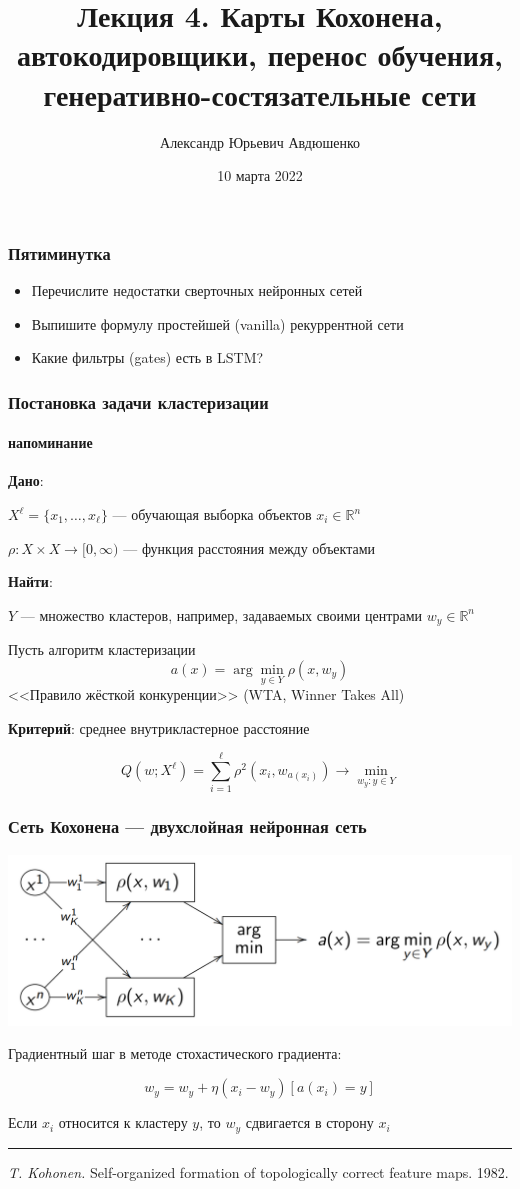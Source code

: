 \documentclass[fullscreen=true, bookmarks=true, hyperref={pdfencoding=unicode}]{beamer}
\title{Лекция 4. Карты Кохонена, автокодировщики, перенос обучения, генеративно-состязательные сети}
\author{Александр Юрьевич Авдюшенко}
\institute{МКН СПбГУ}
\date{10 марта 2022}
\begin{document}

\begin{frame}
\transdissolve[duration=0.2]
\titlepage
\end{frame}


\begin{frame}
  \frametitle{Пятиминутка}
  \begin{itemize}
    \item Перечислите недостатки сверточных нейронных сетей
    \item Выпишите формулу простейшей (vanilla) рекуррентной сети
    \item Какие фильтры (gates) есть в LSTM?
  \end{itemize}
\end{frame}


\begin{frame}
  \frametitle{Постановка задачи кластеризации}
  \framesubtitle{напоминание}

  {\bf Дано}:

   $X^\ell = \{x_1, \dots, x_\ell \}$ — обучающая выборка объектов $x_i \in \mathbb{R}^n$

   $\rho: X \times X \to [0, \infty)$ — функция расстояния между объектами

  {\bf Найти}:

  $Y$ — множество кластеров, например, задаваемых своими центрами $w_y \in \mathbb{R}^n$

  Пусть алгоритм кластеризации
  $$a(x) = \arg\min\limits_{y \in Y} \rho(x, w_y)$$
  <<Правило жёсткой конкуренции>> (WTA, Winner Takes All)

  {\bf Критерий}: среднее внутрикластерное расстояние

  $$ Q(w; X^\ell) = \sum\limits_{i=1}^\ell \rho^2(x_i, w_{a(x_i)}) \to \min\limits_{w_y: y \in Y}$$
\end{frame}


\begin{frame}
  \frametitle{Сеть Кохонена — двухслойная нейронная сеть}

  \begin{center}
    \includegraphics[keepaspectratio,
                     width=0.7\paperwidth]{kohonen-net.png}
  \end{center}

  Градиентный шаг в методе стохастического градиента:

  $$w_y = w_y + \eta(x_i-w_y)[a(x_i)=y]$$

  Если $x_i$ относится к кластеру $y$, то $w_y$ сдвигается в сторону $x_i$

  \noindent\rule{8cm}{0.4pt}

  {\it T. Kohonen.} Self-organized formation of topologically correct feature maps. 1982.
\end{frame}
\end{document}
